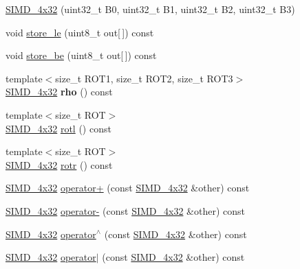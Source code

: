 \begin{DoxyCompactItemize}
\mbox{\hyperlink{class_botan_1_1_s_i_m_d__4x32_a630d5063dfa518ebd4db33136a1364c7}{S\+I\+M\+D\+\_\+4x32}} (uint32\+\_\+t B0, uint32\+\_\+t B1, uint32\+\_\+t B2, uint32\+\_\+t B3)
\item 
void \mbox{\hyperlink{class_botan_1_1_s_i_m_d__4x32_a3bfb23404c6906d0bdb61f3c462edc2a}{store\+\_\+le}} (uint8\+\_\+t out\mbox{[}$\,$\mbox{]}) const
\item 
void \mbox{\hyperlink{class_botan_1_1_s_i_m_d__4x32_ac421365de5827557c16aa89097e15504}{store\+\_\+be}} (uint8\+\_\+t out\mbox{[}$\,$\mbox{]}) const
\item 
\mbox{\label{class_botan_1_1_s_i_m_d__4x32_af029c709f9281585cb804c4b0a664309}} 
{\footnotesize template$<$size\+\_\+t R\+O\+T1, size\+\_\+t R\+O\+T2, size\+\_\+t R\+O\+T3$>$ }\\\mbox{\hyperlink{class_botan_1_1_s_i_m_d__4x32}{S\+I\+M\+D\+\_\+4x32}} {\bfseries rho} () const
\item 
{\footnotesize template$<$size\+\_\+t R\+OT$>$ }\\\mbox{\hyperlink{class_botan_1_1_s_i_m_d__4x32}{S\+I\+M\+D\+\_\+4x32}} \mbox{\hyperlink{class_botan_1_1_s_i_m_d__4x32_a2915571b60c9ce7250029593df2fcb44}{rotl}} () const
\item 
{\footnotesize template$<$size\+\_\+t R\+OT$>$ }\\\mbox{\hyperlink{class_botan_1_1_s_i_m_d__4x32}{S\+I\+M\+D\+\_\+4x32}} \mbox{\hyperlink{class_botan_1_1_s_i_m_d__4x32_aecc836fad6eb953f5f339370d96b58f5}{rotr}} () const
\item 
\mbox{\hyperlink{class_botan_1_1_s_i_m_d__4x32}{S\+I\+M\+D\+\_\+4x32}} \mbox{\hyperlink{class_botan_1_1_s_i_m_d__4x32_ae2ff2ca95e5b6a17ee128888ca047235}{operator+}} (const \mbox{\hyperlink{class_botan_1_1_s_i_m_d__4x32}{S\+I\+M\+D\+\_\+4x32}} \&other) const
\item 
\mbox{\hyperlink{class_botan_1_1_s_i_m_d__4x32}{S\+I\+M\+D\+\_\+4x32}} \mbox{\hyperlink{class_botan_1_1_s_i_m_d__4x32_abc4f7e655f5a1a055143578ee1c53c1c}{operator-\/}} (const \mbox{\hyperlink{class_botan_1_1_s_i_m_d__4x32}{S\+I\+M\+D\+\_\+4x32}} \&other) const
\item 
\mbox{\hyperlink{class_botan_1_1_s_i_m_d__4x32}{S\+I\+M\+D\+\_\+4x32}} \mbox{\hyperlink{class_botan_1_1_s_i_m_d__4x32_addfcb426abcbf5f7f3ed988942eae550}{operator$^\wedge$}} (const \mbox{\hyperlink{class_botan_1_1_s_i_m_d__4x32}{S\+I\+M\+D\+\_\+4x32}} \&other) const
\item 
\mbox{\hyperlink{class_botan_1_1_s_i_m_d__4x32}{S\+I\+M\+D\+\_\+4x32}} \mbox{\hyperlink{class_botan_1_1_s_i_m_d__4x32_a71623f3567e53aa6fd8fa8c4cb05817b}{operator$\vert$}} (const \mbox{\hyperlink{class_botan_1_1_s_i_m_d__4x32}{S\+I\+M\+D\+\_\+4x32}} \&other) const

\end{DoxyCompactItemize}
